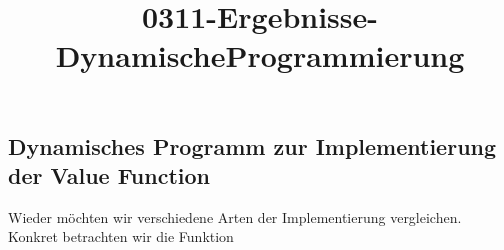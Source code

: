 \documentclass[11pt]{article}
\title{0311-Ergebnisse-DynamischeProgrammierung}
\begin{document}
    
    
    \maketitle
    
    

    
    \hypertarget{dynamisches-programm-zur-implementierung-der-value-function}{%
\subsection{Dynamisches Programm zur Implementierung der Value
Function}\label{dynamisches-programm-zur-implementierung-der-value-function}}

Wieder möchten wir verschiedene Arten der Implementierung vergleichen.
Konkret betrachten wir die Funktion
\end{document}
